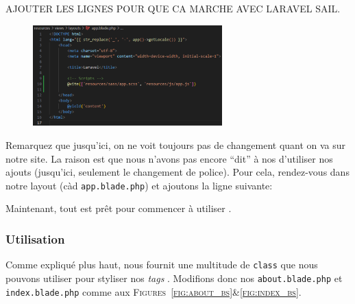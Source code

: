 AJOUTER LES LIGNES POUR QUE CA MARCHE AVEC LARAVEL SAIL.

\vspace{2.8cm}

\begin{figure}
    \vspace{-0.5cm}
    \includegraphics[width=0.65\textwidth]{figures-C1/vite_in_layout.pdf}
\end{figure}

Remarquez que jusqu'ici, on ne voit toujours pas de changement quant on va sur notre site. La raison est que nous n'avons pas encore ``dit'' à nos \views{} d'utiliser nos ajouts (jusqu'ici, seulement le changement de police). Pour cela, rendez-vous dans notre layout (càd \verb|app.blade.php|) et ajoutons la ligne suivante:

\vspace{1cm}
Maintenant, tout est prêt pour commencer à utiliser \bs{}.

\subsubsection[Utilisation]{Utilisation}

Comme expliqué plus haut, \bs{} nous fournit une multitude de \verb|class| que nous pouvons utiliser pour styliser nos \textit{tags} \html{}. Modifions donc nos \views{} \verb|about.blade.php| et \verb|index.blade.php| comme aux \textsc{Figures~\ref{fig:about_bs}\&\ref{fig:index_bs}}.


